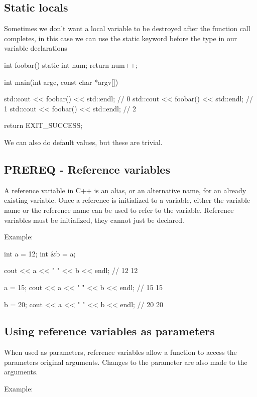\documentclass{report}
\begin{document}
    \pagebreak
    \subsection{Static locals}
    \bigbreak \noindent 
    Sometimes we don't want a local variable to be destroyed after the function call completes, in this case we can use the static keyword before the type in our variable declarations
    \bigbreak \noindent 
    
    \begin{cppcode}
int foobar() { static int num; return num++; }

int main(int argc, const char *argv[]) {
    std::cout << foobar() << std::endl; // 0
    std::cout << foobar() << std::endl; // 1
    std::cout << foobar() << std::endl; // 2

    return EXIT_SUCCESS;
}
    \end{cppcode}
    

    \bigbreak \noindent 
    We can also do default values, but these are trivial.

    \bigbreak \noindent 
    \subsection{PREREQ - Reference variables}
    \bigbreak \noindent 
    \begin{concept}
 A reference variable in C++ is an alias, or an alternative name, for an already existing variable. Once a reference is initialized to a variable, either the variable name or the reference name can be used to refer to the variable. Reference variables must be initialized, they cannot just be declared.
	\end{concept}
    \bigbreak \noindent 
    Example:
    \bigbreak \noindent 
    
    \begin{cppcode}
int a = 12;
int &b = a; 

cout << a << " " << b << endl; // 12 12

a = 15;
cout << a << " " << b << endl; // 15 15

b = 20; 
cout << a << " " << b << endl; // 20 20

    \end{cppcode}
    

    \pagebreak
    \subsection{Using reference variables as parameters}
    \bigbreak \noindent 
    \begin{concept}
 When used as parameters, reference variables allow a function to access the parameters original arguments. Changes to the parameter are also made to the arguments.
	\end{concept}
    \bigbreak \noindent 
    Example:
    \bigbreak \noindent 
    
\end{document}
